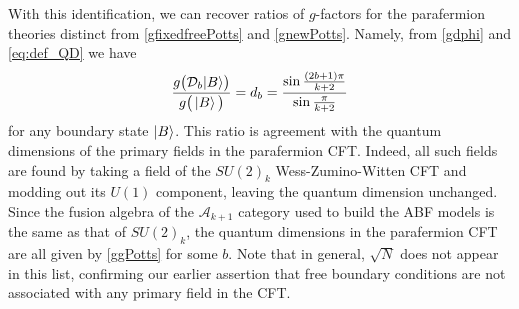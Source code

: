 With this identification, we can recover ratios of $g$-factors for the parafermion theories distinct from \eqref{gfixedfreePotts} and \eqref{gnewPotts}. Namely, from \eqref{gdphi} and \eqref{eq:def_QD} we have 
\begin{align}
\frac{g\big(\mathcal{D}_b|B\rangle\big)}{g\big(\ket{B}\big)} = d_b =\frac{\sin{\frac{(2b+1)\pi}{k+2}}}{\sin\frac{\pi}{k+2}}
\label{ggPotts}
\end{align}
for any boundary state $\ket{B}$. This ratio is agreement with the quantum dimensions of the primary fields in the parafermion CFT. Indeed, all such fields are found by taking a field of the $SU(2)_k$ Wess-Zumino-Witten CFT and modding out its $U(1)$ component, leaving the quantum dimension unchanged. Since the fusion algebra of the $\mathcal{A}_{k+1}$ category used to build the ABF models is the same as that of $SU(2)_k$, the quantum dimensions in the parafermion CFT are all given by \eqref{ggPotts} for some $b$. Note that in general, $\sqrt{N}$ does not appear in this list, confirming our earlier assertion that free boundary conditions are not associated with any primary field in the CFT. 

